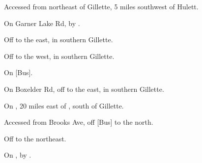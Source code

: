 

\begin{LocationList}

Accessed from  northeast of Gillette, 5 miles southwest of Hulett.

On Garner Lake Rd, by  .

Off  to the east, in southern Gillette.

Off  to the west, in southern Gillette.

\Location{\GarageHQ \Garage}
On [Bus].

On Boxelder Rd, off  to the east, in southern Gillette.

On , 20 miles east of , south of Gillette.

Accessed from Brooks Ave, off [Bus]  to the north.

Off    to the northeast.

\Location{\TruckStop \Gas \Rest}
On , by  .

\end{LocationList}
